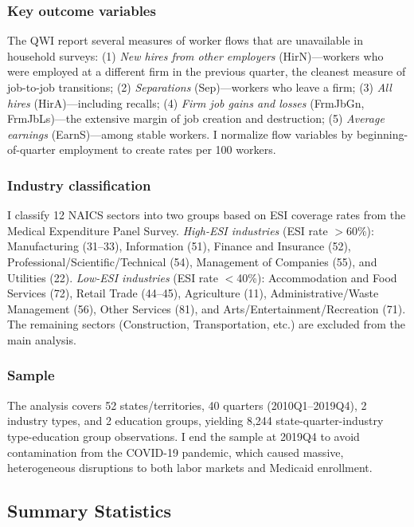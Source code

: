 \documentclass[12pt]{article}
\begin{document}
\subsubsection*{Key outcome variables} The QWI report several measures of worker flows that are unavailable in household surveys: (1) \textit{New hires from other employers} (HirN)---workers who were employed at a different firm in the previous quarter, the cleanest measure of job-to-job transitions; (2) \textit{Separations} (Sep)---workers who leave a firm; (3) \textit{All hires} (HirA)---including recalls; (4) \textit{Firm job gains and losses} (FrmJbGn, FrmJbLs)---the extensive margin of job creation and destruction; (5) \textit{Average earnings} (EarnS)---among stable workers. I normalize flow variables by beginning-of-quarter employment to create rates per 100 workers.

\subsubsection*{Industry classification} I classify 12 NAICS sectors into two groups based on ESI coverage rates from the Medical Expenditure Panel Survey. \textit{High-ESI industries} (ESI rate $>$60\%): Manufacturing (31--33), Information (51), Finance and Insurance (52), Professional/Scientific/Technical (54), Management of Companies (55), and Utilities (22). \textit{Low-ESI industries} (ESI rate $<$40\%): Accommodation and Food Services (72), Retail Trade (44--45), Agriculture (11), Administrative/Waste Management (56), Other Services (81), and Arts/Entertainment/Recreation (71). The remaining sectors (Construction, Transportation, etc.) are excluded from the main analysis.

\subsubsection*{Sample} The analysis covers 52 states/territories, 40 quarters (2010Q1--2019Q4), 2 industry types, and 2 education groups, yielding 8,244 state-quarter-industry type-education group observations. I end the sample at 2019Q4 to avoid contamination from the COVID-19 pandemic, which caused massive, heterogeneous disruptions to both labor markets and Medicaid enrollment.

\subsection{Summary Statistics}


\end{document}

